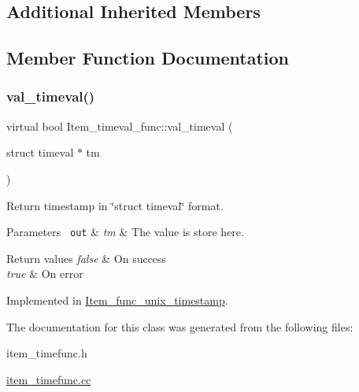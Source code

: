 \subsection*{Additional Inherited Members}


\subsection{Member Function Documentation}
\mbox{\label{classItem__timeval__func_a529c82bce0479faa4b598d3a801645ca}} 
\subsubsection{\texorpdfstring{val\+\_\+timeval()}{val\_timeval()}}
{\footnotesize\ttfamily virtual bool Item\+\_\+timeval\+\_\+func\+::val\+\_\+timeval (\begin{DoxyParamCaption}\item[{struct timeval $\ast$}]{tm }\end{DoxyParamCaption})\hspace{0.3cm}{\ttfamily [pure virtual]}}

Return timestamp in \char`\"{}struct timeval\char`\"{} format. 
\begin{DoxyParams}[1]{Parameters}
\mbox{\texttt{ out}}  & {\em tm} & The value is store here. \\
\hline
\end{DoxyParams}

\begin{DoxyRetVals}{Return values}
{\em false} & On success \\
\hline
{\em true} & On error \\
\hline
\end{DoxyRetVals}


Implemented in \mbox{\hyperlink{classItem__func__unix__timestamp_ac21ec2e7b716887f359bffd70f937187}{Item\+\_\+func\+\_\+unix\+\_\+timestamp}}.



The documentation for this class was generated from the following files\+:\begin{DoxyCompactItemize}
\item 
item\+\_\+timefunc.\+h\item 
\mbox{\hyperlink{item__timefunc_8cc}{item\+\_\+timefunc.\+cc}}\end{DoxyCompactItemize}
